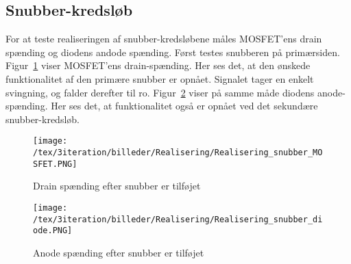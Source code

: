
\subsection{Snubber-kredsløb}
For at teste realiseringen af snubber-kredsløbene måles MOSFET'ens drain spænding og diodens andode spænding. Først testes snubberen på primærsiden. Figur~\ref{fig:realiseirng_snubber_MOSFET_3} viser MOSFET'ens drain-spænding. Her ses det, at den ønskede funktionalitet af den primære snubber er opnået. Signalet tager en enkelt svingning, og falder derefter til ro. Figur~\ref{fig:realiseirng_snubber_diode_3} viser på samme måde diodens anode-spænding. Her ses det, at funktionalitet også er opnået ved det sekundære snubber-kredsløb. 

\begin{figure}[H]
	\center
	\texttt{[image: /tex/3iteration/billeder/Realisering/Realisering\_snubber\_MOSFET.PNG]}
	\caption{Drain spænding efter snubber er tilføjet}
	\label{fig:realiseirng_snubber_MOSFET_3}
\end{figure} 

\begin{figure}[H]
	\center
	\texttt{[image: /tex/3iteration/billeder/Realisering/Realisering\_snubber\_diode.PNG]}
	\caption{Anode spænding efter snubber er tilføjet}
	\label{fig:realiseirng_snubber_diode_3}
\end{figure} 

